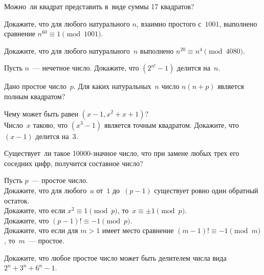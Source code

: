 


\begin{problems}

\item
Можно~ли квадрат представить в~виде суммы 17 квадратов?

\item
Докажите, что для любого натурального $n$, взаимно простого с~$1001$,
выполнено сравнение $n^{60} \equiv 1 \pmod{1001}$.

\item
Докажите, что для любого натурального~$n$ выполнено
$n^{20} \equiv n^{4} \pmod{4080}$.

\item
Пусть $n$~--- нечетное число.
Докажите, что $(2^{n!} - 1)$ делится на~$n$.

\item
Дано простое число~$p$.
Для каких натуральных~$n$ число $n (n + p)$ является полным квадратом?

\item
\subproblem
Чему может быть равен $(x - 1, x^2 + x + 1)$?
\\
\subproblem
Число~$x$ таково, что $(x^3 - 1)$ является точным квадратом.
Докажите, что $(x - 1)$ делится на~$3$.

\item
Существует~ли такое 10000-значное число, что при замене любых трех его соседних
цифр, получится составное число?

\item
Пусть $p$~--- простое число.
\\
\subproblem
Докажите, что для любого~$a$ от~$1$ до~$(p - 1)$ существует ровно один
обратный остаток.
\\
\subproblem
Докажите, что если $x^2 \equiv 1 \pmod{p}$, то~$x \equiv \pm 1 \pmod{p}$.
\\
\subproblem{}
Докажите, что $(p - 1)! \equiv -1 \pmod{p}$.
\\
\subproblem
Докажите, что если для $m > 1$ имеет место сравнение
$(m - 1)! \equiv -1 \pmod{m}$, то~$m$~--- простое.

\item
Докажите, что любое простое число может быть делителем числа вида
$2^n + 3^n + 6^n - 1$.

\end{problems}


